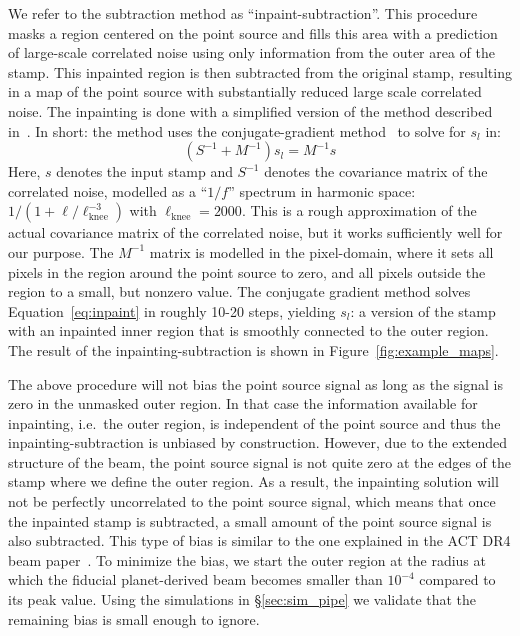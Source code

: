 We refer to the subtraction method as ``inpaint-subtraction''. This procedure masks a region centered on the point source and fills this area with a prediction of large-scale correlated noise using only information from the outer area of the stamp. This inpainted region is then subtracted from the original stamp, resulting in a map of the point source with substantially reduced large scale correlated noise. The inpainting is done with a simplified version of the method described in~\cite{bucher_2012}. In short: the method uses the conjugate-gradient method~\cite{Shewchuk_1994} to solve for $s_l$ in:
\begin{equation}\label{eq:inpaint}
\left(S^{-1} + M^{-1} \right) s_l = M^{-1} s
\end{equation}
Here, $s$ denotes the input stamp and $S^{-1}$ denotes the covariance matrix of the correlated noise, modelled as a ``$1/f$'' spectrum in harmonic space: $1/ (1 + \ell / \ell_{\mathrm{knee}}^{-3})$ with $\ell_{\mathrm{knee}} = 2000$. This is a rough approximation of the actual covariance matrix of the correlated noise, but it works sufficiently well for our purpose. The $M^{-1}$ matrix is modelled in the pixel-domain, where it sets all pixels in the region around the point source to zero, and all pixels outside the region to a small, but nonzero value. The conjugate gradient method solves Equation~\ref{eq:inpaint} in roughly 10-20 steps, yielding $s_l$: a version of the stamp with an inpainted inner region that is smoothly connected to the outer region. The result of the inpainting-subtraction is shown in Figure~\ref{fig:example_maps}.

The above procedure will not bias the point source signal as long as the signal is zero in the unmasked outer region. In that case the information available for inpainting, i.e.\ the outer region, is independent of the point source and thus the inpainting-subtraction is unbiased by construction. However, due to the extended structure of the beam, the point source signal is not quite zero at the edges of the stamp where we define the outer region. As a result, the inpainting solution will not be perfectly uncorrelated to the point source signal, which means that once the inpainted stamp is subtracted, a small amount of the point source signal is also subtracted. This type of bias is similar to the one explained in the ACT DR4 beam paper~\cite{Lungu_2022}. To minimize the bias, we start the outer region at the radius at which the fiducial planet-derived beam becomes smaller than $10^{-4}$ compared to its peak value. Using the simulations in \S\ref{sec:sim_pipe} we validate that the remaining bias is small enough to ignore.
 
